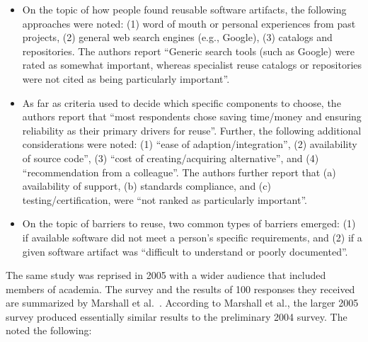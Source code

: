 \documentclass{casicswhitepaper}
\begin{document}
\begin{itemize}

\item On the topic of how people found reusable software artifacts, the following approaches were noted: (1) word of mouth or personal experiences from past projects, (2) general web search engines (e.g., Google), (3) catalogs and repositories.  The authors report ``Generic search tools (such as Google) were rated as somewhat important, whereas specialist reuse catalogs or repositories were not cited as being particularly important''.

\item As far as criteria used to decide which specific components to choose, the authors report that ``most respondents chose saving time/money and ensuring reliability as their primary drivers for reuse''.  Further, the following additional considerations were noted: (1) ``ease of adaption/integration'', (2) availability of source code'', (3) ``cost of creating/acquiring alternative'', and (4) ``recommendation from a colleague''.  The authors further report that (a) availability of support, (b) standards compliance, and (c) testing/certification, were ``not ranked as particularly important''.

\item On the topic of barriers to reuse, two common types of barriers emerged: (1) if available software did not meet a person's specific requirements, and (2) if a given software artifact was ``difficult to understand or poorly documented''.

\end{itemize}

The same study was reprised in 2005 with a wider audience that included members of academia.  The survey and the results of 100 responses they received are summarized by Marshall et al.~\cite{marshall2006software}.  According to Marshall et al., the larger 2005 survey produced essentially similar results to the preliminary 2004 survey.  The noted the following:
\end{document}
